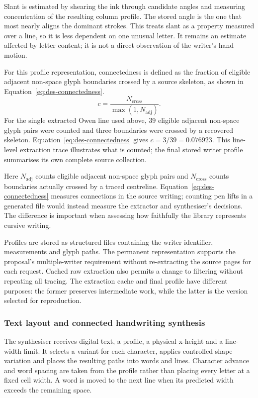 Slant is estimated by shearing the ink through candidate angles and measuring concentration of the resulting column profile. The stored angle is the one that most nearly aligns the dominant strokes. This treats slant as a property measured over a line, so it is less dependent on one unusual letter. It remains an estimate affected by letter content; it is not a direct observation of the writer's hand motion.

For this profile representation, connectedness is defined as the fraction of eligible adjacent non-space glyph boundaries crossed by a source skeleton, as shown in Equation~\ref{eq:des-connectedness}.
\begin{equation}
c=\frac{N_{\mathrm{cross}}}{\max(1,N_{\mathrm{adj}})}.
\label{eq:des-connectedness}
\end{equation}
For the single extracted Owen line used above, 39 eligible adjacent non-space glyph pairs were counted and three boundaries were crossed by a recovered skeleton. Equation~\ref{eq:des-connectedness} gives $c=3/39=0.076923$. This line-level extraction trace illustrates what is counted; the final stored writer profile summarises its own complete source collection.

Here $N_{\mathrm{adj}}$ counts eligible adjacent non-space glyph pairs and $N_{\mathrm{cross}}$ counts boundaries actually crossed by a traced centreline. Equation~\ref{eq:des-connectedness} measures connections in the source writing; counting pen lifts in a generated file would instead measure the extractor and synthesiser's decisions. The difference is important when assessing how faithfully the library represents cursive writing.

Profiles are stored as structured files containing the writer identifier, measurements and glyph paths. The permanent representation supports the proposal's multiple-writer requirement without re-extracting the source pages for each request. Cached raw extraction also permits a change to filtering without repeating all tracing. The extraction cache and final profile have different purposes: the former preserves intermediate work, while the latter is the version selected for reproduction.

\subsubsection{Text layout and connected handwriting synthesis}
\label{sec:des-layout}
The synthesiser receives digital text, a profile, a physical x-height and a line-width limit. It selects a variant for each character, applies controlled shape variation and places the resulting paths into words and lines. Character advance and word spacing are taken from the profile rather than placing every letter at a fixed cell width. A word is moved to the next line when its predicted width exceeds the remaining space.


